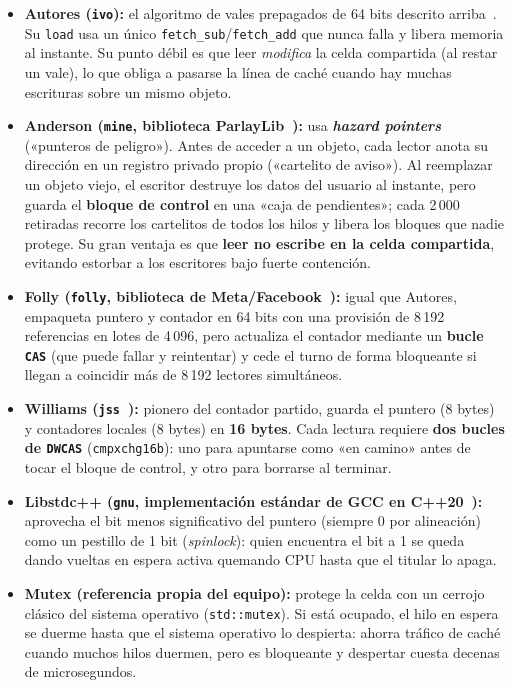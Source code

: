 \documentclass[11pt,a4paper]{article}
\begin{document}
\begin{itemize}
  \item \textbf{Autores (\texttt{ivo}):} el algoritmo de vales prepagados de 64 bits descrito arriba~\cite{dewolff2024waitfree,dewolff2024repo}. Su \texttt{load} usa un único \texttt{fetch\_sub}/\texttt{fetch\_add} que nunca falla y libera memoria al instante. Su punto débil es que leer \emph{modifica} la celda compartida (al restar un vale), lo que obliga a pasarse la línea de caché cuando hay muchas escrituras sobre un mismo objeto.
  \item \textbf{Anderson (\texttt{mine}, biblioteca ParlayLib~\cite{anderson2021cdrc,anderson2023cppcon}):} usa \textbf{\emph{hazard pointers}}~\cite{michael2004hazard} («punteros de peligro»). Antes de acceder a un objeto, cada lector anota su dirección en un registro privado propio («cartelito de aviso»). Al reemplazar un objeto viejo, el escritor destruye los datos del usuario al instante, pero guarda el \textbf{bloque de control} en una «caja de pendientes»; cada 2\,000 retiradas recorre los cartelitos de todos los hilos y libera los bloques que nadie protege. Su gran ventaja es que \textbf{leer no escribe en la celda compartida}, evitando estorbar a los escritores bajo fuerte contención.
  \item \textbf{Folly (\texttt{folly}, biblioteca de Meta/Facebook~\cite{folly2024}):} igual que Autores, empaqueta puntero y contador en 64 bits con una provisión de 8\,192 referencias en lotes de 4\,096, pero actualiza el contador mediante un \textbf{bucle \texttt{CAS}} (que puede fallar y reintentar) y cede el turno de forma bloqueante si llegan a coincidir más de 8\,192 lectores simultáneos.
  \item \textbf{Williams (\texttt{jss}~\cite{williams2012concurrency}):} pionero del contador partido, guarda el puntero (8 bytes) y contadores locales (8 bytes) en \textbf{16 bytes}. Cada lectura requiere \textbf{dos bucles de \texttt{DWCAS}} (\texttt{cmpxchg16b}): uno para apuntarse como «en camino» antes de tocar el bloque de control, y otro para borrarse al terminar.
  \item \textbf{Libstdc++ (\texttt{gnu}, implementación estándar de GCC en C++20~\cite{sutter2014atomic}):} aprovecha el bit menos significativo del puntero (siempre 0 por alineación) como un pestillo de 1 bit (\emph{spinlock}): quien encuentra el bit a 1 se queda dando vueltas en espera activa quemando CPU hasta que el titular lo apaga.
  \item \textbf{Mutex (referencia propia del equipo):} protege la celda con un cerrojo clásico del sistema operativo (\texttt{std::mutex}). Si está ocupado, el hilo en espera se duerme hasta que el sistema operativo lo despierta: ahorra tráfico de caché cuando muchos hilos duermen, pero es bloqueante y despertar cuesta decenas de microsegundos.
\end{itemize}
\end{document}
